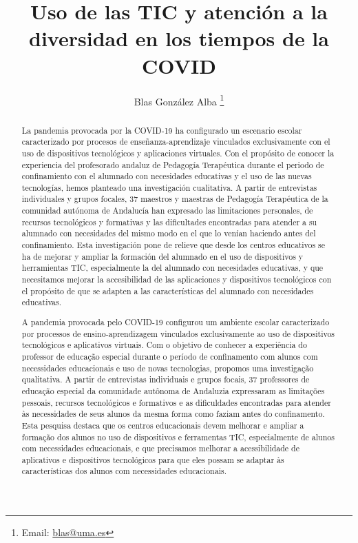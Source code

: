 \documentclass[spanish]{textolivre}
\title{Uso de las TIC y atención a la diversidad en los tiempos de  la COVID}
\author[1]{Blas González Alba \orcid{0000-0002-4769-6522} \thanks{Email: \url{blas@uma.es}}}
\affil[1]{Universidad de Málaga, Facultad de
Ciencias de la Educación, Departamento de didáctica y organización
escolar. Málaga, Andalucía y España.}
\begin{document}
\maketitle

\begin{polyabstract}
\begin{abstract}
La pandemia provocada por la COVID-19 ha configurado un escenario escolar caracterizado por procesos de enseñanza-aprendizaje vinculados exclusivamente con el uso de dispositivos tecnológicos y aplicaciones virtuales. Con el propósito de conocer la experiencia del profesorado andaluz de Pedagogía Terapéutica durante el periodo de confinamiento con el alumnado con necesidades educativas y el uso de las nuevas tecnologías, hemos planteado una investigación cualitativa. A partir de entrevistas individuales y grupos focales, 37 maestros y maestras de Pedagogía Terapéutica de la comunidad autónoma de Andalucía han expresado las limitaciones personales, de recursos tecnológicos y formativas y las dificultades encontradas para atender a su alumnado con necesidades del mismo modo en el que lo venían haciendo antes del confinamiento. Esta investigación pone de relieve que desde los centros educativos se ha de mejorar y ampliar la formación del alumnado en el uso de dispositivos y herramientas TIC, especialmente la del alumnado con necesidades educativas, y que necesitamos mejorar la accesibilidad de las aplicaciones y dispositivos tecnológicos con el propósito de que se adapten a las características del alumnado con necesidades educativas. 

\end{abstract}

\begin{portuguese}
\begin{abstract}
A pandemia provocada pelo COVID-19 configurou um ambiente escolar caracterizado por processos de ensino-aprendizagem vinculados exclusivamente ao uso de dispositivos tecnológicos e aplicativos virtuais. Com o objetivo de conhecer a experiência do professor de educação especial durante o período de confinamento com alunos com necessidades educacionais e uso de novas tecnologias, propomos uma investigação qualitativa. A partir de entrevistas individuais e grupos focais, 37 professores de educação especial da comunidade autônoma de Andaluzia expressaram as limitações pessoais, recursos tecnológicos e formativos e as dificuldades encontradas para atender às necessidades de seus alunos da mesma forma como faziam antes do confinamento. Esta pesquisa destaca que os centros educacionais devem melhorar e ampliar a formação dos alunos no uso de dispositivos e ferramentas TIC, especialmente de alunos com necessidades educacionais, e que precisamos melhorar a acessibilidade de aplicativos e dispositivos tecnológicos para que eles possam se adaptar às características dos alunos com necessidades educacionais.


\end{abstract}
\end{portuguese}
\end{polyabstract}
\end{document}
